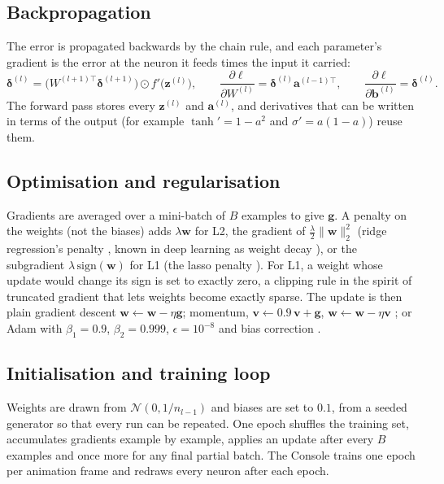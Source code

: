 \documentclass[11pt,a4paper]{article}
\begin{document}
\subsection{Backpropagation}
The error is propagated backwards by the chain rule, and each parameter's gradient is the error at the neuron it feeds times the input it carried:
\begin{equation}
\boldsymbol{\delta}^{(l)} = \big(W^{(l+1)\top}\boldsymbol{\delta}^{(l+1)}\big) \odot f'\big(\mathbf{z}^{(l)}\big), \qquad
\frac{\partial \ell}{\partial W^{(l)}} = \boldsymbol{\delta}^{(l)} \mathbf{a}^{(l-1)\top}, \qquad
\frac{\partial \ell}{\partial \mathbf{b}^{(l)}} = \boldsymbol{\delta}^{(l)} .
\end{equation}
The forward pass stores every $\mathbf{z}^{(l)}$ and $\mathbf{a}^{(l)}$, and derivatives that can be written in terms of the output (for example $\tanh' = 1 - a^2$ and $\sigma' = a(1-a)$) reuse them.

\subsection{Optimisation and regularisation}
Gradients are averaged over a mini-batch of $B$ examples to give $\mathbf{g}$. A penalty on the weights (not the biases) adds $\lambda\mathbf{w}$ for L2, the gradient of $\tfrac{\lambda}{2}\lVert\mathbf{w}\rVert_2^2$ (ridge regression's penalty \citep{hoerl1970ridge}, known in deep learning as weight decay \citep{krogh1992weightdecay}), or the subgradient $\lambda\,\mathrm{sign}(\mathbf{w})$ for L1 (the lasso penalty \citep{tibshirani1996lasso}). For L1, a weight whose update would change its sign is set to exactly zero, a clipping rule in the spirit of truncated gradient \citep{langford2009truncated} that lets weights become exactly sparse. The update is then plain gradient descent $\mathbf{w} \leftarrow \mathbf{w} - \eta\mathbf{g}$; momentum, $\mathbf{v} \leftarrow 0.9\,\mathbf{v} + \mathbf{g}$, $\mathbf{w} \leftarrow \mathbf{w} - \eta\mathbf{v}$ \citep{polyak1964momentum}; or Adam with $\beta_1 = 0.9$, $\beta_2 = 0.999$, $\epsilon = 10^{-8}$ and bias correction \citep{kingma2015adam}.

\subsection{Initialisation and training loop}
Weights are drawn from $\mathcal{N}(0, 1/n_{l-1})$ \citep{lecun1998efficient} and biases are set to $0.1$, from a seeded generator so that every run can be repeated. One epoch shuffles the training set, accumulates gradients example by example, applies an update after every $B$ examples and once more for any final partial batch. The Console trains one epoch per animation frame and redraws every neuron after each epoch.
\end{document}
